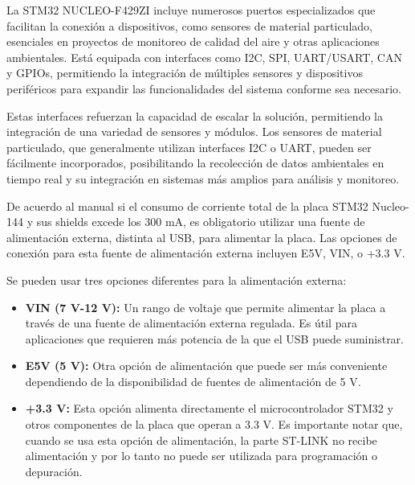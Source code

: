 La STM32 NUCLEO-F429ZI incluye numerosos puertos especializados que facilitan la conexión a dispositivos, como sensores de material particulado, esenciales en proyectos de monitoreo de calidad del aire y otras aplicaciones ambientales. Está equipada con interfaces como I2C, SPI, UART/USART, CAN y GPIOs, permitiendo la integración de múltiples sensores y dispositivos periféricos para expandir las funcionalidades del sistema conforme sea necesario.

Estas interfaces refuerzan la capacidad de escalar la solución, permitiendo la integración de una variedad de sensores y módulos. Los sensores de material particulado, que generalmente utilizan interfaces I2C o UART, pueden ser fácilmente incorporados, posibilitando la recolección de datos ambientales en tiempo real y su integración en sistemas más amplios para análisis y monitoreo.

De acuerdo al manual si el consumo de corriente total de la placa STM32 Nucleo-144 y sus shields excede los 300 mA, es obligatorio utilizar una fuente de alimentación externa, distinta al USB, para alimentar la placa. Las opciones de conexión para esta fuente de alimentación externa incluyen E5V, VIN, o +3.3 V.

Se pueden usar tres opciones diferentes para la alimentación externa:

\begin{itemize}
	\item \textbf{VIN (7 V-12 V):} Un rango de voltaje que permite alimentar la placa a través de una fuente de alimentación externa regulada. Es útil para aplicaciones que requieren más potencia de la que el USB puede suministrar.

	\item \textbf{E5V (5 V):} Otra opción de alimentación que puede ser más conveniente dependiendo de la disponibilidad de fuentes de alimentación de 5 V.

	\item \textbf{+3.3 V:} Esta opción alimenta directamente el microcontrolador STM32 y otros componentes de la placa que operan a 3.3 V. Es importante notar que, cuando se usa esta opción de alimentación, la parte ST-LINK no recibe alimentación y por lo tanto no puede ser utilizada para programación o depuración.
\end{itemize}

